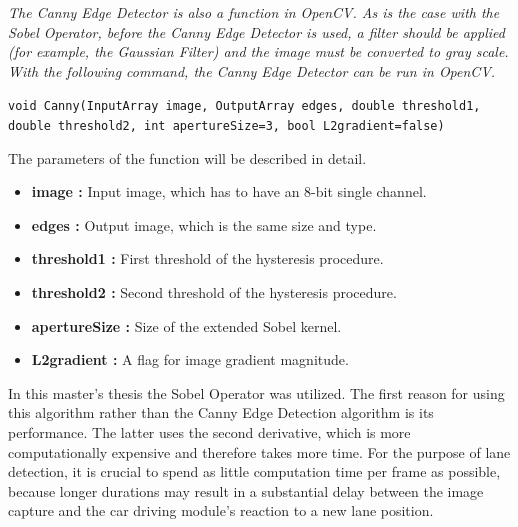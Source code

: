 \emph{\color{green}The Canny Edge Detector is also a function in OpenCV. As is the case with the Sobel Operator, before the Canny Edge Detector is used, a filter should be applied (for example, the Gaussian Filter) and the image must be converted to gray scale. With the following command, the Canny Edge Detector can be run in OpenCV.\cite{Canny_Edge_Detector3}}

 \begin{center}
 
\texttt{void Canny(InputArray image, OutputArray edges, double threshold1, double threshold2, int apertureSize=3, bool L2gradient=false)}

 \end{center}
 
 The parameters of the function will be described in detail.\cite{Canny_Edge_Detector3}
 
     \begin{itemize}

\item \textbf{image : }Input image, which has to have an 8-bit single channel.

\item \textbf{edges : }Output image, which is the same size and type.

\item \textbf{threshold1 : }First threshold of the hysteresis procedure.

\item \textbf{threshold2 : }Second threshold of the hysteresis procedure.

\item \textbf{apertureSize : }Size of the extended Sobel kernel.

\item \textbf{L2gradient : }A flag for image gradient magnitude.

\end{itemize}
 
%



In this master's thesis the Sobel Operator was utilized. The first reason for using this algorithm rather than the Canny Edge Detection algorithm is its performance. The latter uses the second derivative, which is more computationally expensive and therefore takes more time. For the purpose of lane detection, it is crucial to spend as little computation time per frame as possible, because longer durations may result in a substantial delay between the image capture and the car driving module's reaction to a new lane position. 




